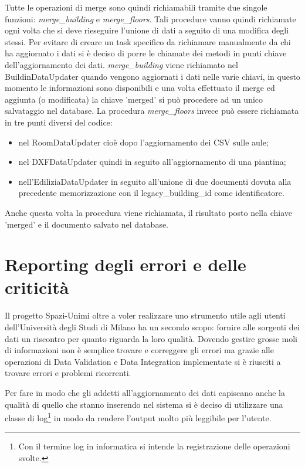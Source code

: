 \documentclass[12pt]{report}
\begin{document}
\vspace{5mm} %

Tutte le operazioni di merge sono quindi richiamabili tramite due singole funzioni: \textit{merge\_building} e \textit{merge\_floors}.
Tali procedure vanno quindi richiamate ogni volta che si deve rieseguire l'unione di dati a seguito di una modifica degli stessi.
Per evitare di creare un task specifico da richiamare manualmente da chi ha aggiornato i dati si è deciso di porre le chiamate dei metodi in punti chiave dell'aggiornamento dei dati.
\textit{merge\_building} viene richiamato nel BuildinDataUpdater quando vengono aggiornati i dati nelle varie chiavi, in questo momento le informazioni sono disponibili e una volta effettuato il merge ed aggiunta (o modificata) la chiave 'merged' si può procedere ad un unico salvataggio nel database.
La procedura \textit{merge\_floors} invece può essere richiamata in tre punti diversi del codice:
\begin{itemize}
\item nel RoomDataUpdater cioè dopo l'aggiornamento dei CSV sulle aule;
\item nel DXFDataUpdater quindi in seguito all'aggiornamento di una piantina;
\item nell'EdiliziaDataUpdater in seguito all'unione di due documenti dovuta alla precedente memorizzazione con il legacy\_building\_id come identificatore.  
\end{itemize}    

Anche questa volta la procedura viene richiamata, il risultato posto nella chiave 'merged' e il documento salvato nel database.



\newpage
\section{Reporting degli errori e delle criticità}

Il progetto Spazi-Unimi oltre a voler realizzare uno strumento utile agli utenti dell'Università degli Studi di Milano ha un secondo scopo: fornire alle sorgenti dei dati un riscontro per quanto riguarda la loro qualità.
Dovendo gestire grosse moli di informazioni non è semplice trovare e correggere gli errori ma grazie alle operazioni di Data Validation e Data Integration implementate si è riusciti a trovare errori e problemi ricorrenti.

Per fare in modo che gli addetti all'aggiornamento dei dati capiscano anche la qualità di quello che stanno inserendo nel sistema si è deciso di utilizzare una classe di log\footnote{Con il termine log in informatica si intende la registrazione delle operazioni svolte.} in modo da rendere l'output molto più leggibile per l'utente.
\end{document}
